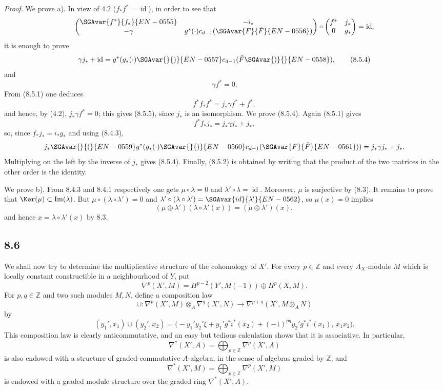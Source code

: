 \emph{Proof.} We prove a). In view of 4.2 ($f_*f^*=\operatorname{id}$), in order to see that
\[
\begin{pmatrix}
\SGAvar{f^*}{f_*}{EN-0555}&-i_*\\
-\gamma&g^*(\cdot)c_{d-1}(\SGAvar{ F}{\check F}{EN-0556})
\end{pmatrix}
\circ
\begin{pmatrix}
f^*&j_*\\
0&g_*
\end{pmatrix}
=\operatorname{id},
\]
it is enough to prove
\[
\gamma j_*+\operatorname{id}=g^*(g_*(\cdot)\SGAvar{}{)}{EN-0557}c_{d-1}(\check F\SGAvar{)}{}{EN-0558}),
\tag{8.5.4}
\]
and
\[
\gamma f^*=0.
\tag{8.5.5}
\]
From (8.5.1) one deduces
\[
f^*f_*f^*=j_*\gamma f^*+f^*,
\]
and hence, by (4.2), $j_*\gamma f^*=0$; this gives (8.5.5), since $j_*$ is an isomorphism. We prove (8.5.4). Again (8.5.1) gives
\[
f^*f_*j_*=j_*\gamma j_*+j_*,
\]
so, since $f_*j_*=i_*g_*$ and using (8.4.3),
\[
j_*\SGAvar{}{(}{EN-0559}g^*(g_*(\cdot)\SGAvar{}{)}{EN-0560}c_{d-1}(\SGAvar{ F}{\check F}{EN-0561}))=j_*\gamma j_*+j_*.
\]
Multiplying on the left by the inverse of $j_*$ gives (8.5.4). Finally, (8.5.2) is obtained by writing that the product of the two matrices in the other order is the identity.

We prove b). From 8.4.3 and 8.4.1 respectively one gets $\mu\circ\lambda=0$ and $\lambda'\circ\lambda=\operatorname{id}$. Moreover, $\mu$ is surjective by (8.3). It remains to prove that $\Ker(\mu)\subset\operatorname{Im}(\lambda)$. But $\mu\circ(\lambda\circ\lambda')=0$ and $\lambda'\circ(\lambda\circ\lambda')=\SGAvar{id}{\lambda'}{EN-0562}$, so $\mu(x)=0$ implies
\[
(\mu\oplus\lambda')(\lambda\circ\lambda'(x))=(\mu\oplus\lambda')(x),
\]
and hence $x=\lambda\circ\lambda'(x)$ by 8.3.

\subsection*{8.6}

We shall now try to determine the multiplicative structure of the cohomology of $X'$. For every $p\in\mathbb Z$ and every $A_X$-module $M$ which is locally constant constructible in a neighbourhood of $Y$, put
\[
\nabla^p(X',M)=H^{p-2}(Y',M(-1))\oplus H^p(X,M).
\]
For $p,q\in\mathbb Z$ and two such modules $M,N$, define a composition law
\[
\cup:\nabla^p(X',M)\otimes_A\nabla^q(X',N)\to
\nabla^{p+q}(X',M\otimes_A N)
\tag{8.6.1}
\]
by
\[
(y_1',x_1)\cup(y_2',x_2)=
\bigl(-y_1'y_2'\xi+y_1'g^*i^*(x_2)+(-1)^{pq}y_2'g^*i^*(x_1),\,x_1x_2\bigr).
\tag{8.6.2}
\]
This composition law is clearly anticommutative, and an easy but tedious calculation shows that it is associative. In particular,
\[
\nabla^*(X',A)=\bigoplus_{p\in\mathbb Z}\nabla^p(X',A)
\]
is also endowed with a structure of graded-commutative $A$-algebra, in the sense of algebras graded by $\mathbb Z$, and
\[
\nabla^*(X',M)=\bigoplus_{p\in\mathbb Z}\nabla^p(X',M)
\]
is endowed with a graded module structure over the graded ring $\nabla^*(X',A)$.

